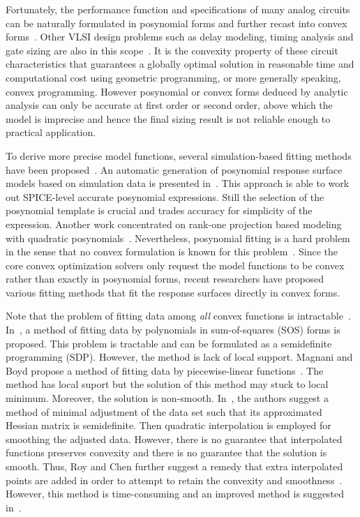 \documentclass{sig-alternate}
\begin{document}
Fortunately, the performance function and specifications of many
analog circuits can be naturally formulated in posynomial forms and 
further recast into convex forms~\cite{GP_OpAmp}. Other
VLSI design problems such as delay modeling, timing analysis and gate
sizing are also in this
scope~\cite{tutorial-GP,tutorial-GP-DATE05}. It is the convexity
property of these circuit characteristics that guarantees a globally
optimal solution in reasonable time and computational cost using
geometric programming, or more generally speaking, convex programming. 
However posynomial or convex forms deduced by analytic analysis
can only be accurate at first order or second order, above which the
model is imprecise and hence the final sizing result is not reliable
enough to practical application. 

To derive more precise model functions, several simulation-based
fitting methods have been proposed~\cite{Gielen05,Daems_03,LiXin_04}. 
An automatic generation of posynomial response surface
models based on simulation data is presented in~\cite{Daems_03}. This
approach is able to work out SPICE-level accurate posynomial
expressions. Still the selection of the posynomial template is crucial
and trades accuracy for simplicity of the expression. Another work
concentrated on rank-one projection based modeling with
quadratic posynomials~\cite{LiXin_04}. Nevertheless, posynomial fitting
is a hard problem in the sense that no convex formulation is known
for this problem~\cite{Roy_05}. Since the core convex optimization solvers
only request the model functions to be convex rather than exactly in
posynomial forms, recent researchers have proposed
various fitting methods that fit the response surfaces directly in
convex forms. 

Note that the problem of fitting data among {\it all}
convex functions is intractable~\cite{Trac_05}.
In~\cite{Trac_05}, a method of fitting data by polynomials in
sum-of-squares (SOS) forms is proposed. This problem is tractable and
can be formulated as a semidefinite programming (SDP). However, the
method is lack of local support. Magnani and Boyd propose a method of
fitting data by piecewise-linear functions~\cite{Piecewise_06}. 
The method has local suport but the solution
of this method may stuck to local minimum. Moreover, 
the solution is non-smooth. 
In~\cite{Roy_05}, the authors suggest a method of minimal adjustment
of the data set such that its approximated Hessian matrix is
semidefinite. Then quadratic interpolation is employed for 
smoothing the adjusted data. However, there
is no guarantee that interpolated functions preserves convexity and
there is no guarantee that the solution is smooth. Thus,
Roy and Chen further suggest a remedy that extra interpolated points are
added in order to attempt to retain the convexity and
smoothness~\cite{Roy_06}. However,
this method is time-consuming and an improved method is suggested
in~\cite{SmartSmooth_07}. 
\end{document}
